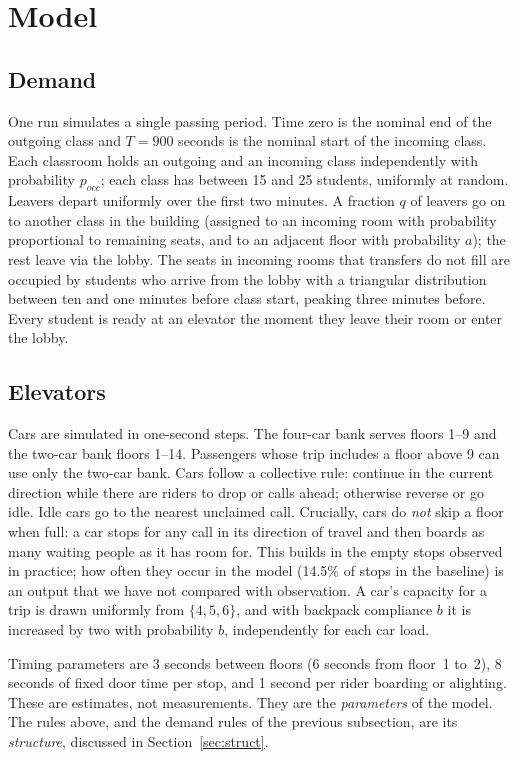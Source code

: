 \section{Model}

\subsection{Demand}

One run simulates a single passing period. Time zero is the nominal end of the outgoing class and
$T=900$ seconds is the nominal start of the incoming class. Each classroom holds an outgoing and an incoming class
independently with probability $p_{occ}$; each class has between 15 and 25 students, uniformly at random.
Leavers depart uniformly over the first two minutes. A fraction $q$ of leavers go on to another class in the
building (assigned to an incoming room with probability proportional to remaining seats, and to an adjacent
floor with probability $a$); the rest leave via the lobby. The seats in incoming rooms that transfers do not fill
are occupied by students who arrive from the lobby with a triangular distribution between ten and one minutes before
class start, peaking three minutes before. Every student is ready at an elevator the moment they leave their room
or enter the lobby.

\subsection{Elevators}

Cars are simulated in one-second steps. The four-car bank serves floors 1--9 and the two-car bank floors 1--14.
Passengers whose trip includes a floor above 9 can use only the two-car bank. Cars follow a collective rule:
continue in the current direction while there are riders to drop or calls ahead; otherwise reverse or go idle.
Idle cars go to the nearest unclaimed call. Crucially, cars do \emph{not} skip a floor when full: a car stops for
any call in its direction of travel and then boards as many waiting people as it has room for. This builds in the
empty stops observed in practice; how often they occur in the model (14.5\% of stops in the baseline) is an
output that we have not compared with observation. A car's capacity for a trip is drawn uniformly from
$\{4,5,6\}$, and with backpack compliance $b$ it is increased by two with probability $b$, independently for each
car load.

Timing parameters are 3 seconds between floors (6 seconds from floor~1 to~2), 8 seconds of fixed door time per
stop, and 1 second per rider boarding or alighting. These are estimates, not measurements. They are the
\emph{parameters} of the model. The rules above, and the demand rules of the previous subsection, are its
\emph{structure}, discussed in Section~\ref{sec:struct}.

